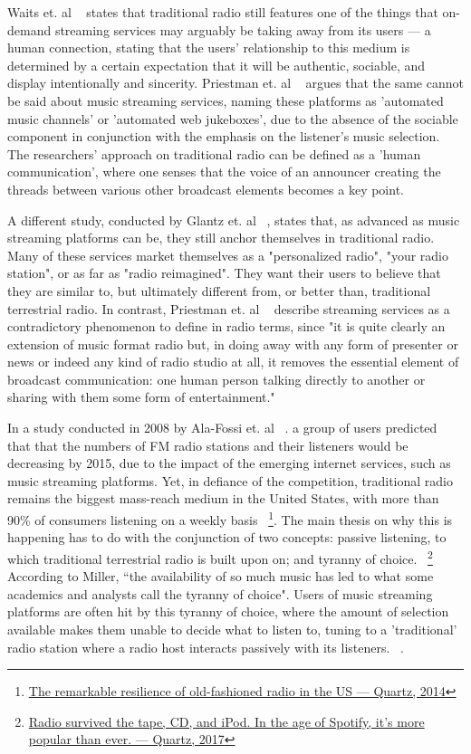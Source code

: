 Waits et. al ~\cite{Waits2007} states that traditional radio still features one of the things that on-demand streaming services may arguably be taking away from its users — a human connection, stating that the users' relationship to this medium is determined by a certain expectation that it will be authentic, sociable, and display intentionally and sincerity. Priestman et. al ~\cite{Priestman2005} argues that the same cannot be said about music streaming services, naming these platforms as 'automated music channels' or 'automated web jukeboxes', due to the absence of the sociable component in conjunction with the emphasis on the listener's music selection. The researchers' approach on traditional radio can be defined as a 'human communication', where one senses that the voice of an announcer creating the threads between various other broadcast elements becomes a key point. 

A different study, conducted by Glantz et. al ~\cite{Glantz2016}, states that, as advanced as music streaming platforms can be, they still anchor themselves in traditional radio. Many of these services market themselves as a "personalized radio", "your radio station", or as far as "radio reimagined". They want their users to believe that they are similar to, but ultimately different from, or better than, traditional terrestrial radio. In contrast, Priestman et. al ~\cite{Priestman2005} describe streaming services as a contradictory phenomenon to define in radio terms, since "it is quite clearly an extension of music format radio but, in doing away with any form of presenter or news or indeed any kind of radio studio at all, it removes the essential element of broadcast communication: one human person talking directly to another or sharing with them some form of entertainment."

In a study conducted in 2008 by Ala-Fossi et. al ~\cite{Ala-Fossi2008}. a group of users predicted that that the numbers of FM radio stations and their listeners would be decreasing by 2015, due to the impact of the emerging internet services, such as music streaming platforms. Yet, in defiance of the competition, traditional radio remains the biggest mass-reach medium in the United States, with more than 90\% of consumers listening on a weekly basis ~\footnote{\href{https://qz.com/195349/the-remarkable-resilience-of-old-fashioned-radio-in-the-us/}{The remarkable resilience of old-fashioned radio in the US — Quartz, 2014}}. The main thesis on why this is happening has to do with the conjunction of two concepts: passive listening, to which traditional terrestrial radio is built upon on; and tyranny of choice. ~\footnote{\href{https://qz.com/1094963/radio-survived-the-tape-cd-and-ipod-in-the-age-of-spotify-its-more-popular-than-ever/}{Radio survived the tape, CD, and iPod. In the age of Spotify, it’s more popular than ever. — Quartz, 2017}} According to Miller, “the availability of so much music has led to what some academics and analysts call the tyranny of choice". Users of music streaming platforms are often hit by this tyranny of choice, where the amount of selection available makes them unable to decide what to listen to, tuning to a 'traditional' radio station where a radio host interacts passively with its listeners. ~\cite{Pedersen2014}.

